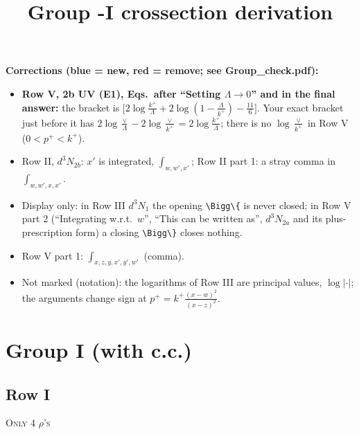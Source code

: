 \documentclass[9pt]{article}
\title{Group -I crossection derivation}
\author{}
\date{}
\numberwithin{equation}{section}
\begin{document}
\maketitle
{\color{blue}\noindent\textbf{Corrections (blue = new, red = remove; see Group\_check.pdf):}
\begin{itemize}
\item \textbf{Row V, 2b UV (E1), Eqs.\ after ``Setting $\Lambda\to0$'' and in the final answer:} the bracket is $\big[2\log\frac{k^+}{\Lambda}+2\log(1-\frac{\Lambda}{k^+})-\frac{11}{6}\big]$. Your exact bracket just before it has $2\log\frac{\vee}{\Lambda}-2\log\frac{\vee}{k^+}=2\log\frac{k^+}{\Lambda}$; there is no $\log\frac{\vee}{k^+}$ in Row V ($0<p^+<k^+$).
\item Row II, $d^3N_{2b}$: $x'$ is integrated, $\int_{w,w',x'}$; Row II part 1: a stray comma in $\int_{w,w',x,x'}$.
\item Display only: in Row III $d^3N_1$ the opening \texttt{\textbackslash Bigg\textbackslash\{} is never closed; in Row V part 2 (``Integrating w.r.t.\ $w$'', ``This can be written as'', $d^3N_{2a}$ and its plus-prescription form) a closing \texttt{\textbackslash Bigg\textbackslash\}} closes nothing.
\item Row V part 1: $\int_{x,z,y,x',y',w'}$ (comma).
\item Not marked (notation): the logarithms of Row III are principal values, $\log|\cdot|$; the arguments change sign at $p^+=k^+\frac{(x-w)^2}{(x-z)^2}$.
\end{itemize}}

\section{Group I (with c.c.)}
\subsection{Row I\,}
\textsc{Only 4 $\rho$'s}
\end{document}
